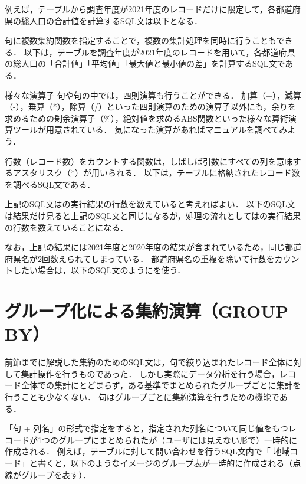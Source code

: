 例えば，テーブルから調査年度が2021年度のレコードだけに限定して，各都道府県の総人口の合計値を計算するSQL文は以下となる．


句に複数集約関数を指定することで，複数の集計処理を同時に行うこともできる．
以下は，テーブルを調査年度が2021年度のレコードを用いて，各都道府県の総人口の「合計値」「平均値」「最大値と最小値の差」を計算するSQL文である．

\begin{notebox}{様々な演算子}
句や句の中では，四則演算も行うことができる．
加算（+），減算（-），乗算（*），除算（/）といった四則演算のための演算子以外にも，余りを求めるための剰余演算子（\%），絶対値を求めるABS関数といった様々な算術演算ツールが用意されている．
気になった演算があればマニュアルを調べてみよう．
\end{notebox}

行数（レコード数）をカウントする関数は，しばしば引数にすべての列を意味するアスタリスク（*）が用いられる． 以下は，テーブルに格納されたレコード数を調べるSQL文である．

上記のSQL文はの実行結果の行数を数えていると考えればよい．
以下のSQL文は結果だけ見ると上記のSQL文と同じになるが，処理の流れとしてはの実行結果の行数を数えていることになる．

なお，上記の結果には2021年度と2020年度の結果が含まれているため，同じ都道府県名が2回数えられてしまっている．
都道府県名の重複を除いて行数をカウントしたい場合は，以下のSQL文のようにを使う．

\section{グループ化による集約演算（GROUP BY）}
前節までに解説した集約のためのSQL文は，句で絞り込まれたレコード全体に対して集計操作を行うものであった．
しかし実際にデータ分析を行う場合，レコード全体での集計にとどまらず，ある基準でまとめられたグループごとに集計を行うことも少なくない．
句はグループごとに集約演算を行うための機能である．

「句 + 列名」の形式で指定をすると，指定された列名について同じ値をもつレコードが1つのグループにまとめられたが（ユーザには見えない形で）一時的に作成される．
例えば，テーブルに対して問い合わせを行うSQL文内で「 地域コード」と書くと，以下のようなイメージのグループ表が一時的に作成される（点線がグループを表す）．

